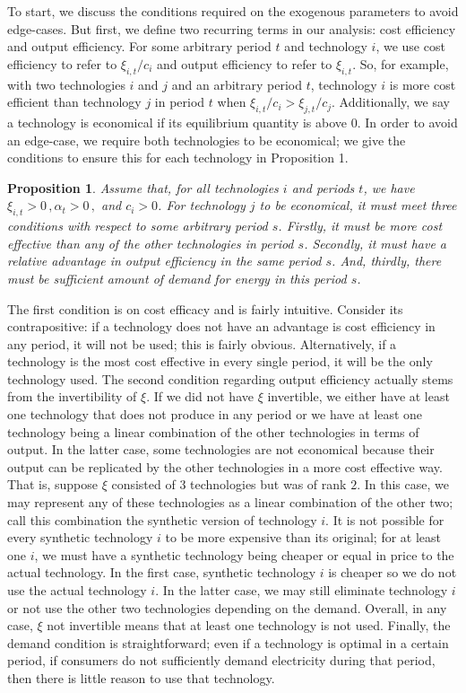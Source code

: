 \documentclass[11pt,a4paper,leqno]{extarticle}
\newtheorem{proposition}{Proposition}
\begin{document}
	To start, we discuss the conditions required on the exogenous parameters  to avoid edge-cases. But  first, we define two recurring terms in our analysis: cost efficiency and output efficiency. For some arbitrary period $t$ and technology $i$, we use cost efficiency to refer to $\xi_{i,t}/c_i$ and output efficiency to refer to $\xi_{i,t}$. So, for example, with two technologies $i$ and $j$ and an arbitrary period $t$, technology $i$ is more cost efficient than technology $j$ in period $t$ when $\xi_{i,t}/c_i > \xi_{j,t}/c_j$. Additionally, we say a technology is economical if its equilibrium quantity is above 0. In order to avoid an edge-case, we require both technologies to be economical; we give the conditions to ensure this for each technology in Proposition 1. 
	\begin{proposition}
		Assume that, for all technologies $i$ and  periods $t$, we have $\xi_{i,t} > 0 \, , \alpha_t > 0 \, ,$ and $ c_i > 0$. For technology $j$ to be economical, it must meet three conditions with respect to some arbitrary period $s$. Firstly, it must be more cost effective than any of the other technologies in period $s$. Secondly, it must have  a relative advantage in output efficiency in the same period $s$. And, thirdly, there must be sufficient amount of demand for energy in this period $s$. 
	\end{proposition}
	The first condition is on cost efficacy and is fairly intuitive. Consider its contrapositive: if a technology does not have an advantage is cost efficiency in any period, it will not be used; this is fairly obvious. Alternatively, if a technology is the most cost effective in every single period, it will be the only technology used. The second condition regarding output efficiency actually stems from the invertibility of $\xi$. If we did not have $\xi$ invertible, we either have at least one technology that does not produce in any period or we have at least one technology being a linear combination of the other technologies in terms of output. In the latter case, some technologies are not economical because their output can be replicated by the other technologies in a more cost effective way. That is, suppose $\xi$ consisted of 3 technologies but was of rank $2$. In this case, we may represent any of these technologies as a linear combination of the other two; call this combination the synthetic version of technology $i$. It is not possible for every synthetic technology $i$ to be more expensive than its original; for at least one $i$, we must have a synthetic technology being cheaper or equal in price to the actual technology. In the first case, synthetic technology $i$ is cheaper so we do not use the actual technology $i$. In the latter case, we may still eliminate technology $i$ or not use the other two technologies depending on the demand. Overall, in any case, $\xi$ not invertible means that at least one technology is not used. Finally, the demand condition is straightforward; even if a technology is optimal in a certain period, if consumers do not sufficiently demand electricity during that period, then there is little reason to use that technology. 
	
\end{document}
